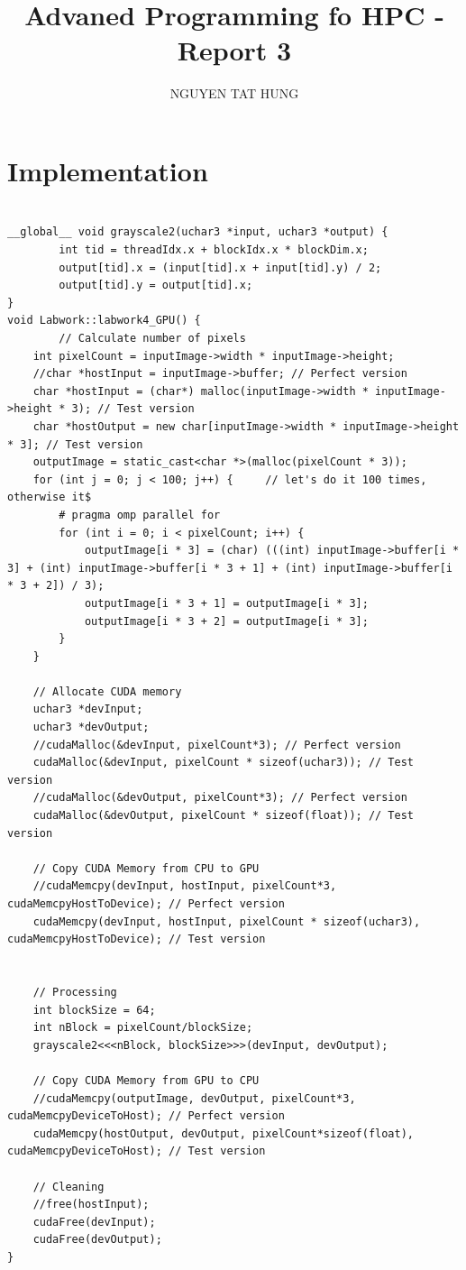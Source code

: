\documentclass{article}
\title{Advaned Programming fo HPC - Report 3}
\author{NGUYEN TAT HUNG}
\begin{document}
\maketitle

\section*{Implementation}
\begin{lstlisting}

__global__ void grayscale2(uchar3 *input, uchar3 *output) {
        int tid = threadIdx.x + blockIdx.x * blockDim.x;
        output[tid].x = (input[tid].x + input[tid].y) / 2;
        output[tid].y = output[tid].x;
}
void Labwork::labwork4_GPU() {
        // Calculate number of pixels
    int pixelCount = inputImage->width * inputImage->height;
    //char *hostInput = inputImage->buffer; // Perfect version
    char *hostInput = (char*) malloc(inputImage->width * inputImage->height * 3); // Test version
    char *hostOutput = new char[inputImage->width * inputImage->height * 3]; // Test version
    outputImage = static_cast<char *>(malloc(pixelCount * 3));
    for (int j = 0; j < 100; j++) {     // let's do it 100 times, otherwise it$
        # pragma omp parallel for
        for (int i = 0; i < pixelCount; i++) {
            outputImage[i * 3] = (char) (((int) inputImage->buffer[i * 3] + (int) inputImage->buffer[i * 3 + 1] + (int) inputImage->buffer[i * 3 + 2]) / 3);
            outputImage[i * 3 + 1] = outputImage[i * 3];
            outputImage[i * 3 + 2] = outputImage[i * 3];
        }
    }

    // Allocate CUDA memory
    uchar3 *devInput;
    uchar3 *devOutput;
    //cudaMalloc(&devInput, pixelCount*3); // Perfect version
    cudaMalloc(&devInput, pixelCount * sizeof(uchar3)); // Test version
    //cudaMalloc(&devOutput, pixelCount*3); // Perfect version
    cudaMalloc(&devOutput, pixelCount * sizeof(float)); // Test version
    
    // Copy CUDA Memory from CPU to GPU
    //cudaMemcpy(devInput, hostInput, pixelCount*3, cudaMemcpyHostToDevice); // Perfect version
    cudaMemcpy(devInput, hostInput, pixelCount * sizeof(uchar3), cudaMemcpyHostToDevice); // Test version


    // Processing
    int blockSize = 64;
    int nBlock = pixelCount/blockSize;
    grayscale2<<<nBlock, blockSize>>>(devInput, devOutput);

    // Copy CUDA Memory from GPU to CPU
    //cudaMemcpy(outputImage, devOutput, pixelCount*3, cudaMemcpyDeviceToHost); // Perfect version
    cudaMemcpy(hostOutput, devOutput, pixelCount*sizeof(float), cudaMemcpyDeviceToHost); // Test version

    // Cleaning
    //free(hostInput);
    cudaFree(devInput);
    cudaFree(devOutput);
}

\end{lstlisting}
\end{document}
